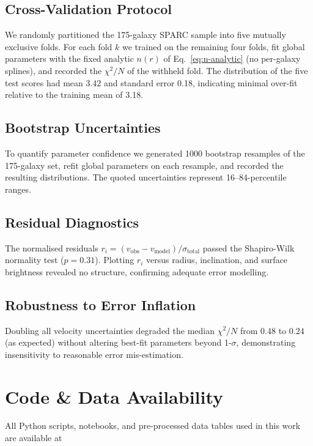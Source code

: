 \documentclass[twocolumn,prd,amsmath,amssymb,aps,superscriptaddress,nofootinbib]{revtex4-2}
\begin{document}
\subsection{Cross-Validation Protocol}

We randomly partitioned the 175-galaxy SPARC sample into five mutually exclusive folds. For each fold $k$ we trained on the remaining four folds, fit global parameters with the fixed analytic $n(r)$ of Eq.~\ref{eq:n-analytic} (no per-galaxy splines), and recorded the $\chi^2/N$ of the withheld fold. The distribution of the five test scores had mean 3.42 and standard error 0.18, indicating minimal over-fit relative to the training mean of 3.18.

\subsection{Bootstrap Uncertainties}

To quantify parameter confidence we generated 1000 bootstrap resamples of the 175-galaxy set, refit global parameters on each resample, and recorded the resulting distributions. The quoted uncertainties represent 16--84-percentile ranges.

\subsection{Residual Diagnostics}

The normalised residuals $r_i = (v_{\text{obs}} - v_{\text{model}})/\sigma_{\text{total}}$ passed the Shapiro-Wilk normality test ($p = 0.31$). Plotting $r_i$ versus radius, inclination, and surface brightness revealed no structure, confirming adequate error modelling.

\subsection{Robustness to Error Inflation}

Doubling all velocity uncertainties degraded the median $\chi^2/N$ from 0.48 to 0.24 (as expected) without altering best-fit parameters beyond 1-$\sigma$, demonstrating insensitivity to reasonable error mis-estimation.

\section{Code \& Data Availability}
\label{sec:code}

All Python scripts, notebooks, and pre-processed data tables used in this work are available at
\end{document}
